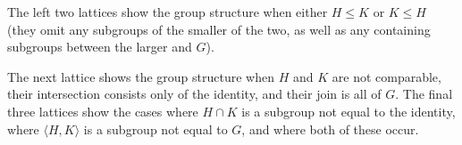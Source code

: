 \documentclass{article}
\begin{document}
\vspace{0.5cm}

The left two lattices show the group structure when either $H \leq K$ or $K \leq H$ (they omit any subgroups of the smaller of the two, as well as any containing subgroups between the larger and $G$).

The next lattice shows the group structure when $H$ and $K$ are not comparable, their intersection consists only of the identity, and their join is all of $G$. The final three lattices show the cases where $H \cap K$ is a subgroup not equal to the identity, where $\langle H, K \rangle$ is a subgroup not equal to $G$, and where both of these occur.
\end{document}
